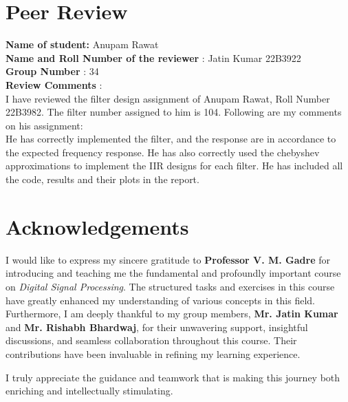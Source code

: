 \documentclass{article}
\begin{document}
\section{Peer Review}
\textbf{Name of student:} Anupam Rawat\\
\textbf{Name and Roll Number of the reviewer} : Jatin Kumar 22B3922\\
\textbf{Group Number} : 34\\
\textbf{Review Comments} :\\
I have reviewed the filter design assignment of Anupam Rawat, Roll Number 22B3982. The filter number assigned to him is 104. Following are my comments on his
assignment:\\
He has correctly implemented the filter, and the response are in accordance to the expected frequency response. He has also correctly used the chebyshev approximations to
implement the IIR designs for each filter. He has included all the code, results and their plots in the report.\\

\section*{Acknowledgements}

I would like to express my sincere gratitude to \textbf{Professor V. M. Gadre} for introducing and teaching me the fundamental and profoundly important course on \textit{Digital Signal Processing}. The structured tasks and exercises in this course have greatly enhanced my understanding of various concepts in this field.
\\
Furthermore, I am deeply thankful to my group members, \textbf{Mr. Jatin Kumar} and \textbf{Mr. Rishabh Bhardwaj}, for their unwavering support, insightful discussions, and seamless collaboration throughout this course. Their contributions have been invaluable in refining my learning experience.

\noindent I truly appreciate the guidance and teamwork that is making this journey both enriching and intellectually stimulating.
\end{document}
